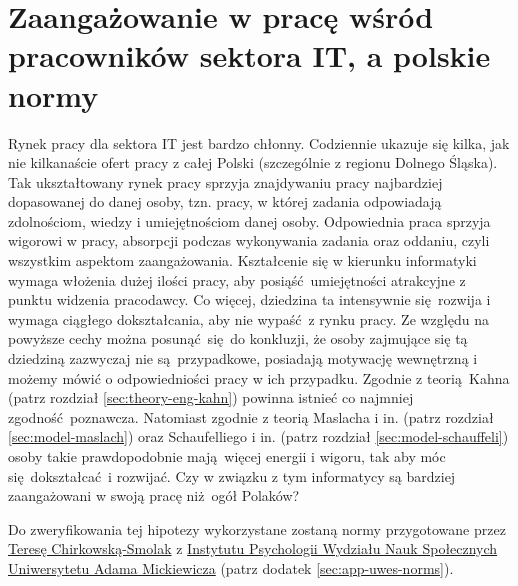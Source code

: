 \section{Zaangażowanie w pracę wśród pracowników sektora IT, a polskie normy}
Rynek pracy dla sektora IT jest bardzo chłonny. Codziennie ukazuje się kilka, jak nie kilkanaście ofert pracy z całej Polski (szczególnie z regionu Dolnego Śląska). Tak ukształtowany rynek pracy sprzyja znajdywaniu pracy najbardziej dopasowanej do danej osoby, tzn. pracy, w której zadania odpowiadają zdolnościom, wiedzy i umiejętnościom danej osoby. Odpowiednia praca sprzyja wigorowi w pracy, absorpcji podczas wykonywania zadania oraz oddaniu, czyli wszystkim aspektom zaangażowania. Kształcenie
się w kierunku informatyki wymaga włożenia dużej ilości pracy, aby posiąść umiejętności atrakcyjne z punktu widzenia pracodawcy. Co więcej, dziedzina ta intensywnie się rozwija i wymaga ciągłego dokształcania, aby nie wypaść z rynku pracy. Ze względu na powyższe cechy można posunąć się do konkluzji, że osoby zajmujące się tą dziedziną zazwyczaj nie są przypadkowe, posiadają motywację wewnętrzną i możemy mówić o odpowiedniości pracy w ich przypadku. Zgodnie z teorią Kahna (patrz
rozdział \ref{sec:theory-eng-kahn}) powinna istnieć co najmniej zgodność poznawcza. Natomiast zgodnie z teorią Maslacha i in. (patrz rozdział \ref{sec:model-maslach}) oraz Schaufelliego i in. (patrz rozdział \ref{sec:model-schauffeli}) osoby takie prawdopodobnie mają więcej energii i wigoru, tak aby móc się dokształcać i rozwijać. Czy w związku z tym informatycy są bardziej zaangażowani w swoją pracę
niż ogół Polaków? 

Do zweryfikowania tej hipotezy wykorzystane zostaną normy przygotowane przez \href{http://www.psychologia.amu.edu.pl/ip-uam/struktura-zatrudnienia-w-instytucie/curriculum-vitae-teresa-chirkowska-smolak/}{Teresę Chirkowską-Smolak} z \href{http://www.psychologia.amu.edu.pl/}{Instytutu Psychologii Wydziału Nauk Społecznych Uniwersytetu Adama Mickiewicza} (patrz dodatek \ref{sec:app-uwes-norms}). 

